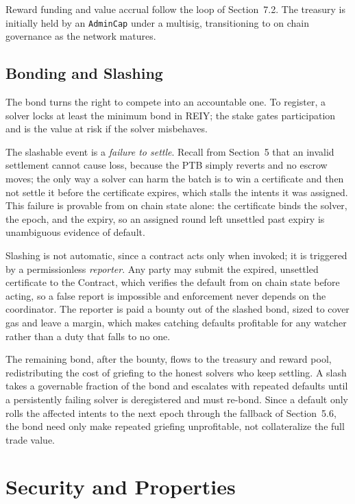 \documentclass[10pt,sigconf,nonacm]{acmart}
\theoremstyle{reiythm}
\begin{document}
Reward funding and value accrual follow the loop of Section~7.2. The treasury is
initially held by an \texttt{AdminCap} under a multisig, transitioning to on chain
governance as the network matures.

\subsection{Bonding and Slashing}

The bond turns the right to compete into an accountable one. To register, a solver
locks at least the minimum bond in REIY; the stake gates participation and is the
value at risk if the solver misbehaves.

The slashable event is a \emph{failure to settle}. Recall from Section~5 that an
invalid settlement cannot cause loss, because the PTB simply reverts and no escrow
moves; the only way a solver can harm the batch is to win a certificate and then
not settle it before the certificate expires, which stalls the intents it was
assigned. This failure is provable from on chain state alone: the certificate
binds the solver, the epoch, and the expiry, so an assigned round left unsettled
past expiry is unambiguous evidence of default.

Slashing is not automatic, since a contract acts only when invoked; it is
triggered by a permissionless \emph{reporter}. Any party may submit the expired,
unsettled certificate to the Contract, which verifies the default from on chain
state before acting, so a false report is impossible and enforcement never depends
on the coordinator. The reporter is paid a bounty out of the slashed bond, sized
to cover gas and leave a margin, which makes catching defaults profitable for any
watcher rather than a duty that falls to no one.

The remaining bond, after the bounty, flows to the treasury and reward pool,
redistributing the cost of griefing to the honest solvers who keep settling. A
slash takes a governable fraction of the bond and escalates with repeated defaults
until a persistently failing solver is deregistered and must re-bond. Since a
default only rolls the affected intents to the next epoch through the fallback of
Section~5.6, the bond need only make repeated griefing unprofitable, not
collateralize the full trade value.

\section{Security and Properties}
\end{document}
